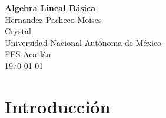 \documentclass[a4paper,12pt]{article} %
\begin{document}
\begin{titlepage}
    \pagecolor{MidnightBlue}
    \color{white}
    \centering
    {\Huge \textbf{Algebra Lineal Básica}} \\[2.5cm] %
    {\Large Hernandez Pacheco Moises} \\[0.5cm]       %
    {\Large Crystal} \\[2.5cm]       %
    {\Large Universidad Nacional Autónoma de México} \\[0.5cm]   %
    {\Large FES Acatlán} \\[0.5cm]   %
    \vfill
    {\large \today}                              %
\end{titlepage}

\pagecolor{white}
\color{black}

\tableofcontents %

\newpage
\section{Introducción}
\lipsum[1-3] %
\end{document}
